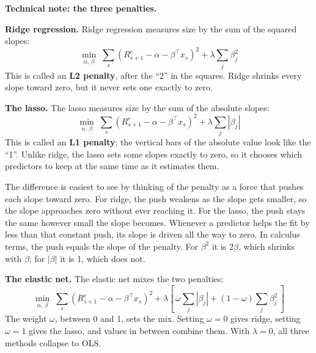 \begin{technote}
\textbf{Technical note: the three penalties.}

\textbf{Ridge regression.} Ridge regression measures size by the sum of the squared slopes:
\begin{equation}
  \min_{\alpha,\,\beta} \; \sum_{s} \left(R^{e}_{s+1} - \alpha - \beta^{\top} x_s\right)^2 + \lambda \sum_{j} \beta_j^2
  \label{eq:20-ridge}
\end{equation}
This is called an \textbf{L2 penalty}, after the ``2'' in the squares. Ridge shrinks every slope toward zero, but it never sets one exactly to zero.

\textbf{The lasso.} The lasso measures size by the sum of the absolute slopes:
\begin{equation}
  \min_{\alpha,\,\beta} \; \sum_{s} \left(R^{e}_{s+1} - \alpha - \beta^{\top} x_s\right)^2 + \lambda \sum_{j} |\beta_j|
  \label{eq:20-lasso}
\end{equation}
This is called an \textbf{L1 penalty}; the vertical bars of the absolute value look like the ``1''. Unlike ridge, the lasso sets some slopes exactly to zero, so it chooses which predictors to keep at the same time as it estimates them.

The difference is easiest to see by thinking of the penalty as a force that pushes each slope toward zero. For ridge, the push weakens as the slope gets smaller, so the slope approaches zero without ever reaching it. For the lasso, the push stays the same however small the slope becomes. Whenever a predictor helps the fit by less than that constant push, its slope is driven all the way to zero. In calculus terms, the push equals the slope of the penalty. For $\beta^2$ it is $2\beta$, which shrinks with $\beta$; for $|\beta|$ it is 1, which does not.

\textbf{The elastic net.} The elastic net  mixes the two penalties:
\begin{equation}
  \min_{\alpha,\,\beta} \; \sum_{s} \left(R^{e}_{s+1} - \alpha - \beta^{\top} x_s\right)^2
  + \lambda \left[\, \omega \sum_{j} |\beta_j| + (1-\omega) \sum_{j} \beta_j^2 \,\right]
  \label{eq:20-enet}
\end{equation}
The weight $\omega$, between 0 and 1, sets the mix. Setting $\omega = 0$ gives ridge, setting $\omega = 1$ gives the lasso, and values in between combine them. With $\lambda = 0$, all three methods collapse to OLS.
\end{technote}

